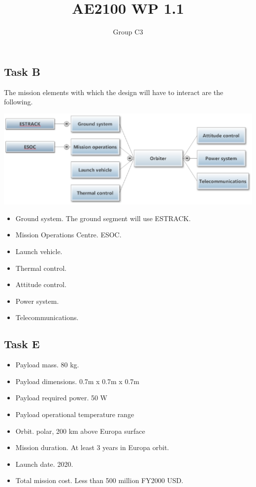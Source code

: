 \documentclass{article}
\title{AE2100 WP 1.1}
\author{Group C3}
\begin{document}
\maketitle
\subsection*{Task B}

The mission elements with which the design will have to interact are
the following.

\includegraphics[scale=.65]{block-diagram-WP1-1B.eps}

\begin{itemize}
\item{Ground system.} The ground segment will use ESTRACK.
\item{Mission Operations Centre.} ESOC.
\item{Launch vehicle.}
\item{Thermal control.}
\item{Attitude control.}
\item{Power system.}
\item{Telecommunications.}
\end{itemize}

\subsection*{Task E}
\begin{itemize}
  \item{Payload mass.} 80 \si{kg}.
  \item{Payload dimensions.} 0.7m x 0.7m x 0.7m
  \item{Payload required power.} 50 W
  \item{Payload operational temperature range}
  \item{Orbit.} polar, 200 km above Europa surface
  \item{Mission duration.} At least 3 years in Europa orbit.
  \item{Launch date.} 2020.
  \item{Total mission cost.} Less than 500 million FY2000 USD.
\end{itemize}
\end{document}
